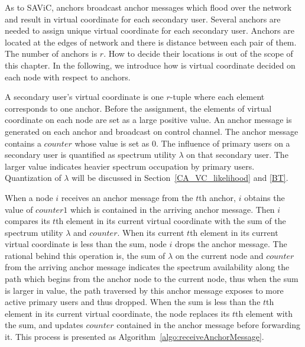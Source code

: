 As to SAViC, anchors broadcast anchor messages which flood over the network and result in virtual coordinate for each secondary user.
Several anchors are needed to assign unique virtual coordinate for each secondary user.
Anchors are located at the edges of network and there is distance between each pair of them.
The number of anchors is $r$.
How to decide their locations is out of the scope of this chapter.
In the following, we introduce how is virtual coordinate decided on each node with respect to anchors.


A secondary user's virtual coordinate is one $r$-tuple where each element corresponds to one anchor.
Before the assignment, the elements of virtual coordinate on each node are set as a large positive value.
An anchor message is generated on each anchor and broadcast on control channel.
The anchor message contains a $counter$ whose value is set as 0.
The influence of primary users on a secondary user is quantified as spectrum utility $\lambda$ on that secondary user.
The larger value indicates heavier spectrum occupation by primary users.
Quantization of $\lambda$ will be discussed in Section~\ref{CA_VC_likelihood} and \ref{BT}.

When a node $i$ receives an anchor message from the $t$th anchor, $i$ obtains the value of $counter1$ which is contained in the arriving anchor message.
Then $i$ compares its $t$th element in its current virtual coordinate with the sum of the spectrum utility $\lambda$ and $counter$.
When its current $t$th element in its current virtual coordinate is less than the sum, node $i$ drops the anchor message.
The rational behind this operation is, the sum of $\lambda$ on the current node and $counter$ from the arriving anchor message indicates the spectrum availability along the path which begins from the anchor node to the current node, thus when the sum is larger in value, the path traversed by this anchor message exposes to more active primary users and thus dropped.
When the sum is less than the $t$th element in its current virtual coordinate, the node replaces its $t$th element with the sum, and updates $counter$ contained in the anchor message before forwarding it.
This process is presented as Algorithm~\ref{algo:receiveAnchorMessage}.

